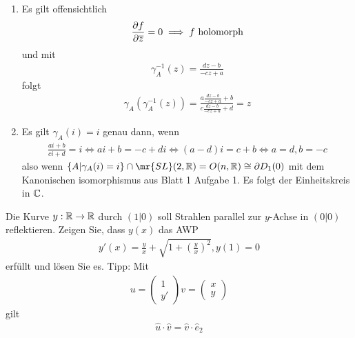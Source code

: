 \documentclass[ngerman]{report}
\begin{document}
\begin{answer}
\begin{enumerate}
            \item Es gilt offensichtlich 
            \begin{align*}
                \pder[f]{\overline{z}}=0 \implies f \text{ holomorph}
            \end{align*}
            und mit
            \begin{align*}
                \gamma_A^{-1}(z) = \frac{dz-b}{-cz+a}
            \end{align*}
            folgt
            \begin{align*}
                \gamma_A(\gamma_A^{-1}(z)) = \frac{a\frac{dz-b}{-cz+a}+b}{c\frac{dz-b}{-cz+a}+d} = z
            \end{align*}
            \item Es gilt $\gamma_A(i) = i$ genau dann, wenn
            \begin{align*}
                \frac{ai+b}{ci+d} = i \iff ai+b = -c+di \iff (a-d)i = c+b \iff a=d,b=-c
            \end{align*}
            also wenn $\{A|\gamma_A(i) = i\}\cap \mr{SL}(2,\R) = O(n,\R) \cong \partial D_1(0)$ mit dem Kanonischen isomorphismus aus Blatt 1 Aufgabe 1. Es folgt der Einheitskreis in $\C$.
        \end{enumerate}
    \end{answer}
    \newpage
    \begin{question}
        Die Kurve $y : \R \to \R$ durch $(1 | 0)$ soll Strahlen parallel zur $y$-Achse in $(0 | 0)$ reflektieren. Zeigen Sie, dass $y(x)$ das AWP
        \begin{align*}
            y'(x) = \frac{y}{x} + \sqrt{1+\left(\frac{y}{x}\right)^2}, y(1) = 0
        \end{align*}
        erfüllt und lösen Sie es. Tipp: Mit
        \begin{align*}
            u = \begin{pmatrix}
                1\\
                y'
            \end{pmatrix}
            v = \begin{pmatrix}
                x\\
                y
            \end{pmatrix}
        \end{align*}
        gilt 
        \begin{align*}
            \hat{u}\cdot \hat{v} = \hat{v} \cdot \hat{e}_2
        \end{align*}
    \end{question}
\end{document}
